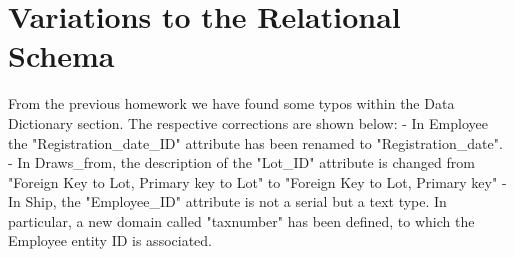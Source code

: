 \section{Variations to the Relational Schema}

From the previous homework we have found some typos within the Data Dictionary section. The respective corrections are shown below:
- In Employee the "Registration_date_ID" attribute has been renamed to "Registration_date".
- In Draws_from, the description of the "Lot_ID" attribute is changed from "Foreign Key to Lot, Primary key to Lot" to "Foreign Key to Lot, Primary key"
- In Ship, the "Employee_ID" attribute is not a serial but a text type. In particular, a new domain called "taxnumber" has been defined, to which the Employee entity ID is associated.